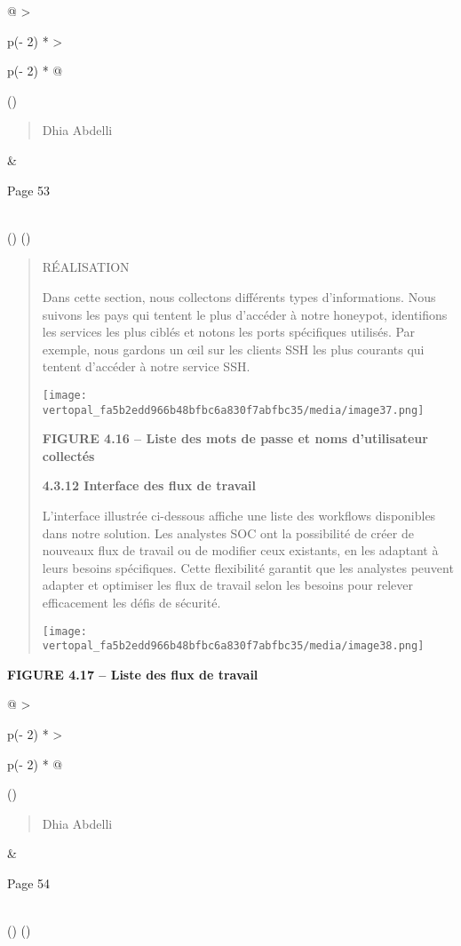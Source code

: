 \documentclass[
]{article}
\begin{document}
\begin{longtable}[]{@{}
  >{\raggedright\arraybackslash}p{(\columnwidth - 2\tabcolsep) * }
  >{\raggedright\arraybackslash}p{(\columnwidth - 2\tabcolsep) * }@{}}
\toprule()
\begin{minipage}[b]{\linewidth}\raggedright
\begin{quote}
Dhia Abdelli
\end{quote}
\end{minipage} & \begin{minipage}[b]{\linewidth}\raggedright
Page 53
\end{minipage} \\
\midrule()
\endhead
\bottomrule()
\end{longtable}

\begin{quote}
RÉALISATION

Dans cette section, nous collectons différents types d'informations.
Nous suivons les pays qui tentent le plus d'accéder à notre honeypot,
identifions les services les plus ciblés et notons les ports spécifiques
utilisés. Par exemple, nous gardons un œil sur les clients SSH les plus
courants qui tentent d'accéder à notre service SSH.

\texttt{[image: vertopal\_fa5b2edd966b48bfbc6a830f7abfbc35/media/image37.png]}

\textbf{FIGURE 4.16 -- Liste des mots de passe et noms d'utilisateur
collectés}

\textbf{4.3.12 Interface des flux de travail}

L'interface illustrée ci-dessous affiche une liste des workflows
disponibles dans notre solution. Les analystes SOC ont la possibilité de
créer de nouveaux flux de travail ou de modifier ceux existants, en les
adaptant à leurs besoins spécifiques. Cette flexibilité garantit que les
analystes peuvent adapter et optimiser les flux de travail selon les
besoins pour relever efficacement les défis de sécurité.

\texttt{[image: vertopal\_fa5b2edd966b48bfbc6a830f7abfbc35/media/image38.png]}
\end{quote}

\textbf{FIGURE 4.17 -- Liste des flux de travail}

\begin{longtable}[]{@{}
  >{\raggedright\arraybackslash}p{(\columnwidth - 2\tabcolsep) * }
  >{\raggedright\arraybackslash}p{(\columnwidth - 2\tabcolsep) * }@{}}
\toprule()
\begin{minipage}[b]{\linewidth}\raggedright
\begin{quote}
Dhia Abdelli
\end{quote}
\end{minipage} & \begin{minipage}[b]{\linewidth}\raggedright
Page 54
\end{minipage} \\
\midrule()
\endhead
\bottomrule()
\end{longtable}
\end{document}
